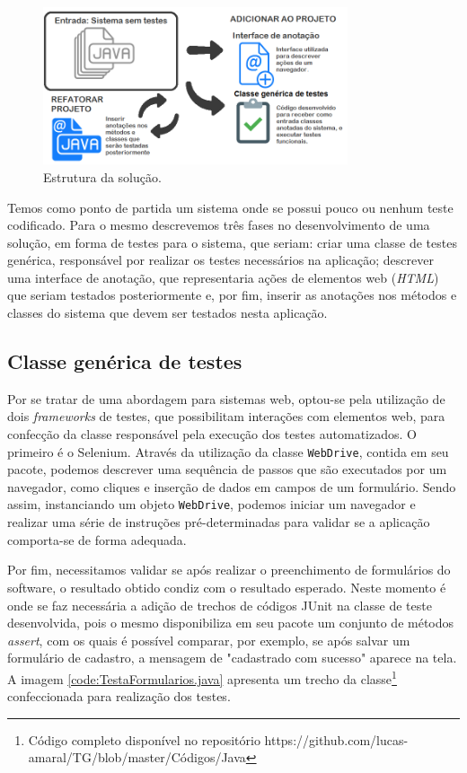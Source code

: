 \documentclass[tg]{mdtufsm}
\begin{document}
\begin{figure}[!htb]
	\centering
	\includegraphics[width=0.8\textwidth]{solucao1}
	\caption{Estrutura da solução.}
	\label{fig:solucao1}
\end{figure}

Temos como ponto de partida um sistema onde se possui pouco ou nenhum teste codificado. Para o mesmo descrevemos  três fases no desenvolvimento de uma solução, em forma de testes para o sistema,
que seriam: criar uma classe de testes genérica, responsável por realizar os testes necessários na aplicação; descrever uma interface de anotação, que representaria ações de elementos web (\emph{HTML}) que
seriam testados posteriormente e, por fim, inserir as anotações nos métodos e classes do sistema que devem ser testados nesta aplicação.

\subsection{Classe genérica de testes}
Por se tratar de uma abordagem para sistemas web, optou-se pela utilização de dois \emph{frameworks} de testes, que possibilitam interações com elementos web, para confecção da classe responsável pela execução dos testes automatizados.
O primeiro é o Selenium. Através da utilização da classe \texttt{WebDrive}, contida em seu pacote, podemos descrever uma sequência de passos que são executados por um navegador, como cliques e inserção de dados em campos de um
formulário. Sendo assim, instanciando um objeto \texttt{WebDrive}, podemos iniciar um navegador e realizar uma série de instruções pré-determinadas para validar se a aplicação comporta-se de forma adequada.

Por fim, necessitamos validar se após realizar o preenchimento de formulários do software, o resultado obtido condiz com o resultado esperado. Neste momento é onde se faz necessária a adição de trechos de códigos JUnit na classe de teste
desenvolvida, pois o mesmo disponibiliza em seu pacote um conjunto de métodos \emph{assert}, com os quais é possível comparar, por exemplo, se após salvar um formulário de cadastro, a mensagem de "cadastrado com sucesso" aparece na tela.
A imagem \ref{code:TestaFormularios.java} apresenta um trecho da classe\footnote{Código completo disponível no repositório https://github.com/lucas-amaral/TG/blob/master/Códigos/Java} confeccionada para realização dos testes.
\end{document}
